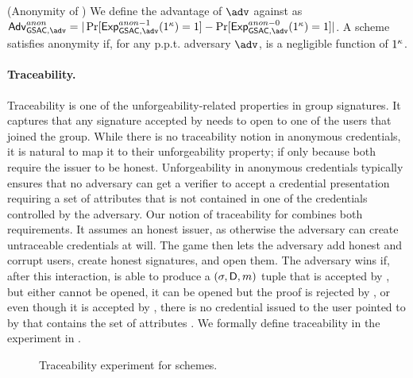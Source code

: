 \begin{definition}{(Anonymity of \GSAC)}
  \label{def:anonymity-gsac}
  We define the advantage \AdvGSACAnon of $\adv$ against \ExpGSACAnonb as
  $\AdvGSACAnon=|\Pr\lbrack\ExpGSACAnono(1^\secpar)=1\rbrack-
  \Pr\lbrack\ExpGSACAnonz(1^\secpar)=1\rbrack|$.
  A \GSAC scheme satisfies anonymity if, for any p.p.t. adversary $\adv$,
  \AdvAnon is a negligible function of $1^\kappa$.
\end{definition}

\paragraph{Traceability.} %
Traceability is one of the unforgeability-related properties in group
signatures. It captures that any signature accepted by \Verify needs to open
to one of the users that joined the group. While there is no traceability notion
in anonymous credentials, it is natural to map it to their unforgeability
property; if only because both require the issuer to be honest. Unforgeability
in anonymous credentials typically ensures that no adversary can get a verifier
to accept a credential presentation requiring a set of attributes that is not
contained in one of the credentials controlled by the adversary.
%
Our notion of traceability for \GSAC combines both requirements. It assumes an
honest issuer, as otherwise the adversary can create untraceable credentials at
will. The game then lets the adversary add honest and corrupt users, create
honest signatures, and open them. The adversary wins if, after this interaction,
is able to produce a $(\sigma,\mathsf{D},m)$ tuple that is accepted by \Verify,
but either cannot be opened, it can be opened but the proof is rejected by
\Judge, or even though it is accepted by \Judge, there is no credential issued
to the user pointed to by \Open that contains the set of attributes \DAttrs. We
formally define traceability in the \ExpTrace experiment in
.

\begin{figure}[htp!]
  \caption{Traceability experiment for \GSAC schemes.}
  \label{fig:exp-gsac-trace}
\end{figure}

